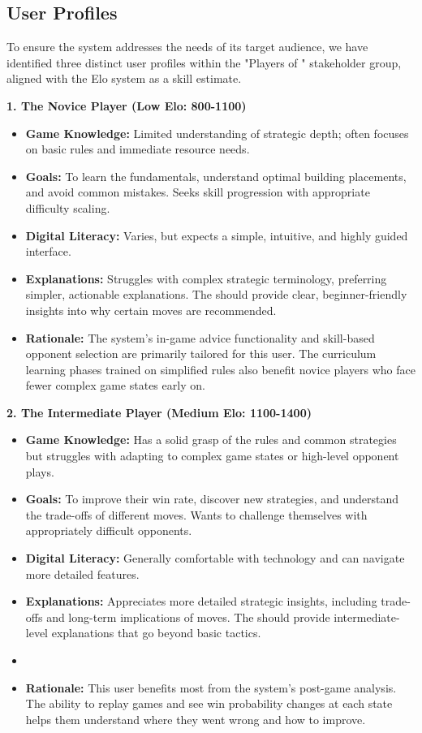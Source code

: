 \documentclass{article}
\begin{document}
\subsection{User Profiles}\label{subsec:User Profiles}
To ensure the system addresses the needs of its target audience, we have identified three distinct user profiles
within the "Players of \emph{\Catan{}}" stakeholder group, aligned with the Elo system as a skill estimate.

\hspace{1cm}

\noindent\textbf{1. The Novice Player (Low Elo: 800-1100)}
\begin{itemize}
    \item \textbf{Game Knowledge:} Limited understanding of strategic depth; often focuses on basic rules and immediate resource needs.
    \item \textbf{Goals:} To learn the fundamentals, understand optimal building placements, and avoid common mistakes. Seeks skill progression with appropriate difficulty scaling.
    \item \textbf{Digital Literacy:} Varies, but expects a simple, intuitive, and highly guided interface.
    \item \textbf{\LLM{} Explanations:} Struggles with complex strategic terminology, preferring simpler, actionable explanations. The \LLM{} should provide clear, beginner-friendly insights into why certain moves are recommended.
    \item \textbf{Rationale:} The system's in-game advice functionality and skill-based opponent selection are primarily tailored for this user. The curriculum learning phases trained on simplified rules also benefit novice players who face fewer complex game states early on.
\end{itemize}

\noindent\textbf{2. The Intermediate Player (Medium Elo: 1100-1400)}
\begin{itemize}
    \item \textbf{Game Knowledge:} Has a solid grasp of the rules and common strategies but struggles with adapting to complex game states or high-level opponent plays.
    \item \textbf{Goals:} To improve their win rate, discover new strategies, and understand the trade-offs of different moves. Wants to challenge themselves with appropriately difficult opponents.
    \item \textbf{Digital Literacy:} Generally comfortable with technology and can navigate more detailed features.
    \item \textbf{\LLM{} Explanations:} Appreciates more detailed strategic insights, including trade-offs and long-term implications of moves. The \LLM{} should provide intermediate-level explanations that go beyond basic tactics.
    \item \item \textbf{Rationale:} This user benefits most from the system's post-game analysis. The ability to replay games and see win probability changes at each state helps them understand where they went wrong and how to improve.
\end{itemize}
\end{document}
